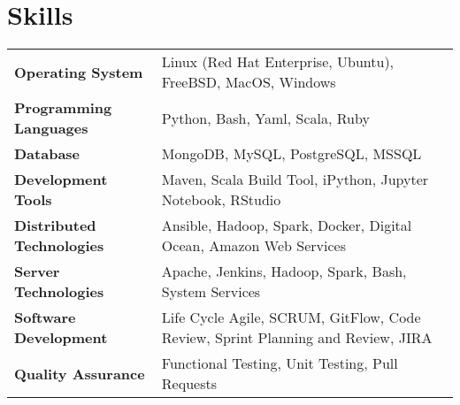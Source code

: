 \documentclass[10pt,a4paper]{article}
\begin{document}
  \newpage


  \vspace*{2mm}\section*{Skills}
  \noindent\begin{tabularx}{17cm}{l X}
    \textbf{Operating System} & Linux (Red Hat Enterprise, Ubuntu), FreeBSD, MacOS, Windows \\
    \textbf{Programming Languages} & Python, Bash, Yaml, Scala, Ruby \\
    \textbf{Database} & MongoDB, MySQL, PostgreSQL, MSSQL \\
    \textbf{Development Tools} & Maven, Scala Build Tool, iPython, Jupyter Notebook, RStudio \\
    \textbf{Distributed Technologies} & Ansible, Hadoop, Spark, Docker, Digital Ocean, Amazon Web Services \\
    \textbf{Server Technologies} & Apache, Jenkins, Hadoop, Spark, Bash, System Services \\
    \textbf{Software Development} & Life Cycle Agile, SCRUM, GitFlow, Code Review, Sprint Planning and Review, JIRA \\
    \textbf{Quality Assurance} & Functional Testing, Unit Testing, Pull Requests
  \end{tabularx}
\end{document}
